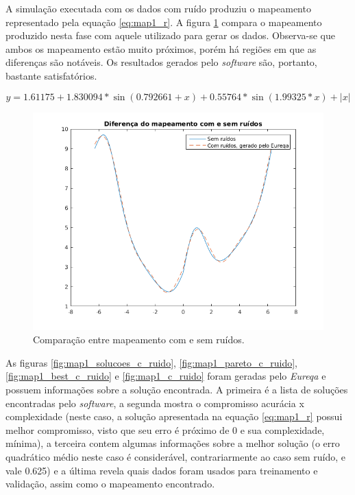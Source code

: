 	\FloatBarrier

A simulação executada com os dados com ruído produziu o mapeamento representado
pela equação \ref{eq:map1_r}. A figura \ref{fig:comparaca_map1}  compara o mapeamento produzido
nesta fase com aquele utilizado para gerar os dados. Observa-se que ambos os
mapeamento estão muito próximos, porém há regiões em que as diferenças são
notáveis. Os resultados gerados pelo \textit{software} são, portanto, bastante
satisfatórios.

\begin{equation}
y = 1.61175 + 1.830094*\sin(0.792661 + x) +
0.55764*\sin(1.99325*x) + |x|
\label{eq:map1_r}
\end{equation}

\FloatBarrier
\begin{figure}[H]
		  \centering
		  \includegraphics[width=0.65\linewidth]{aproximacao/comparacao_map1}
		  \caption{Comparação entre mapeamento com e sem ruídos.} 
		  \label{fig:comparaca_map1} 
		  
		\end{figure}
\FloatBarrier

As figuras \ref{fig:map1_solucoes_c_ruido}, \ref{fig:map1_pareto_c_ruido},
\ref{fig:map1_best_c_ruido}  e \ref{fig:map1_c_ruido} foram geradas pelo
\textit{Eureqa} e possuem informações sobre a solução encontrada. A primeira
é a lista de soluções encontradas pelo \textit{software}, a segunda mostra o
compromisso acurácia x complexidade (neste caso, a solução apresentada na
equação \ref{eq:map1_r} possui melhor compromisso, visto que seu erro é próximo
de 0 e sua complexidade, mínima), a terceira contem algumas informações sobre
a melhor solução (o erro quadrático médio neste caso é considerável,
contrariarmente ao caso sem ruído, e vale 0.625) e a última revela quais dados
foram usados para treinamento e validação, assim como o mapeamento encontrado.


